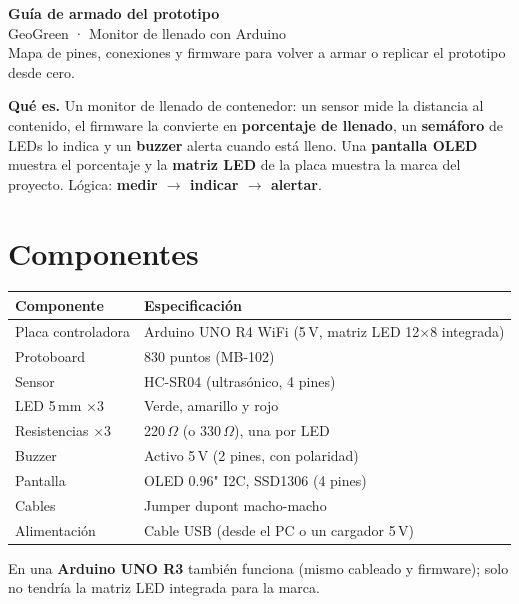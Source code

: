 \documentclass[10pt,letterpaper]{article}
\begin{document}
\begin{tcolorbox}[enhanced, colback=AIEPNavy, colframe=AIEPNavy, arc=0mm,
  boxrule=0pt, left=5mm, right=5mm, top=5mm, bottom=5mm]
{\color{white}\Huge\bfseries Guía de armado del prototipo}\\[2mm]
{\color{white}\Large GeoGreen · Monitor de llenado con Arduino}\\[3mm]
{\color{AIEPSoftBlue} Mapa de pines, conexiones y firmware para volver a armar o replicar el
prototipo desde cero.}
\end{tcolorbox}

\begin{nota}
\textbf{Qué es.} Un monitor de llenado de contenedor: un sensor mide la distancia al contenido,
el firmware la convierte en \textbf{porcentaje de llenado}, un \textbf{semáforo} de LEDs lo indica
y un \textbf{buzzer} alerta cuando está lleno. Una \textbf{pantalla OLED} muestra el porcentaje y
la \textbf{matriz LED} de la placa muestra la marca del proyecto.
Lógica: \textbf{medir $\rightarrow$ indicar $\rightarrow$ alertar}.
\end{nota}

\section{Componentes}
\begin{tabularx}{\linewidth}{@{}L{5.2cm}Y@{}}
\hline
\textbf{Componente} & \textbf{Especificación}\\
\hline
Placa controladora & Arduino UNO R4 WiFi (5\,V, matriz LED 12$\times$8 integrada)\\
Protoboard & 830 puntos (MB-102)\\
Sensor & HC-SR04 (ultrasónico, 4 pines)\\
LED 5\,mm $\times$3 & Verde, amarillo y rojo\\
Resistencias $\times$3 & 220\,$\Omega$ (o 330\,$\Omega$), una por LED\\
Buzzer & Activo 5\,V (2 pines, con polaridad)\\
Pantalla & OLED 0.96" I2C, SSD1306 (4 pines)\\
Cables & Jumper dupont macho-macho\\
Alimentación & Cable USB (desde el PC o un cargador 5\,V)\\
\hline
\end{tabularx}

\begin{nota}
En una \textbf{Arduino UNO R3} también funciona (mismo cableado y firmware); solo no tendría la
matriz LED integrada para la marca.
\end{nota}
\end{document}
